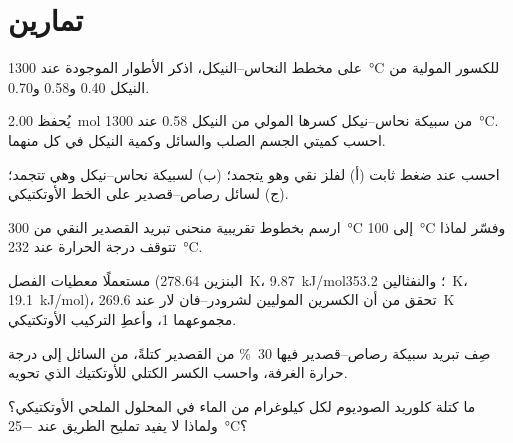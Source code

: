 \section{تمارين}

\begin{exercise}[$\star$]\label{exo:b2:solid-liquid-diagrams:1}
على مخطط النحاس--النيكل، اذكر الأطوار الموجودة عند
\qty{1300}{\degreeCelsius} للكسور المولية من النيكل 0.40 و0.58 و0.70.
\end{exercise}

\begin{exercise}[$\star$]\label{exo:b2:solid-liquid-diagrams:2}
يُحفظ \qty{2.00}{mol} من سبيكة نحاس--نيكل كسرها المولي من النيكل 0.58
عند \qty{1300}{\degreeCelsius}. احسب كميتي الجسم الصلب والسائل وكمية
النيكل في كل منهما.
\end{exercise}

\begin{exercise}[$\star$]\label{exo:b2:solid-liquid-diagrams:3}
احسب  عند ضغط ثابت (أ) لفلز نقي وهو يتجمد؛
(ب) لسبيكة نحاس--نيكل وهي تتجمد؛ (ج) لسائل رصاص--قصدير على
الخط الأوتكتيكي.
\end{exercise}

\begin{exercise}[$\star$]\label{exo:b2:solid-liquid-diagrams:4}
ارسم بخطوط تقريبية منحنى تبريد القصدير النقي من \qty{300}{\degreeCelsius} إلى
\qty{100}{\degreeCelsius} وفسّر لماذا تتوقف درجة الحرارة عند
\qty{232}{\degreeCelsius}.
\end{exercise}

\begin{exercise}[$\star\star$]\label{exo:b2:solid-liquid-diagrams:5}
مستعملًا معطيات الفصل (البنزين \qty{278.64}{K}، \qty{9.87}{kJ/mol}؛
والنفثالين \qty{353.2}{K}، \qty{19.1}{kJ/mol})، تحقق من أن الكسرين الموليين
لشرودر--فان لار عند \qty{269.6}{K} مجموعهما 1، وأعطِ
التركيب الأوتكتيكي.
\end{exercise}

\begin{exercise}[$\star\star$]\label{exo:b2:solid-liquid-diagrams:6}
صِف تبريد سبيكة رصاص--قصدير فيها 30~\% من القصدير كتلةً، من السائل
إلى درجة حرارة الغرفة، واحسب الكسر الكتلي للأوتكتيك الذي تحويه.
\end{exercise}

\begin{exercise}[$\star\star$]\label{exo:b2:solid-liquid-diagrams:7}
ما كتلة كلوريد الصوديوم لكل كيلوغرام من الماء في المحلول الملحي
الأوتكتيكي؟ ولماذا لا يفيد تمليح الطريق عند \qty{-25}{\degreeCelsius}؟
\end{exercise}

